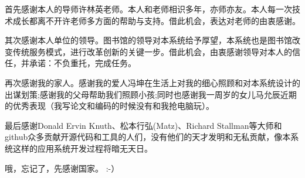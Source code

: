 
\begin{ack}
  首先感谢本人的导师许林英老师。本人和老师相识多年，亦师亦友。本人每一次技术成长都离不开许老师多方面的帮助与支持。借此机会，表达对老师的由衷感谢。

  其次感谢本人单位的领导。图书馆的领导对本系统给予厚望，本系统也是图书馆改变传统服务模式，进行改革创新的关键一步。借此机会，由衷感谢领导对本人的信任，并承诺：不负重托，完成任务。

  再次感谢我的家人。感谢我的爱人冯坤在生活上对我的细心照顾和对本系统设计的出谋划策;感谢我的父母帮助我们照顾小孩;同时也感谢我一周岁的女儿马允辰近期的优秀表现（我写论文和编码的时候没有和我抢电脑玩）。

  最后感谢Donald Ervin Knuth、松本行弘(Matz)、Richard Stallman等大师和github众多贡献开源代码和工具的人们，没有他们的天才发明和无私贡献，像本系统这样的应用系统开发过程将暗无天日。

  哦，忘记了，先感谢国家。 :-）
\end{ack}
